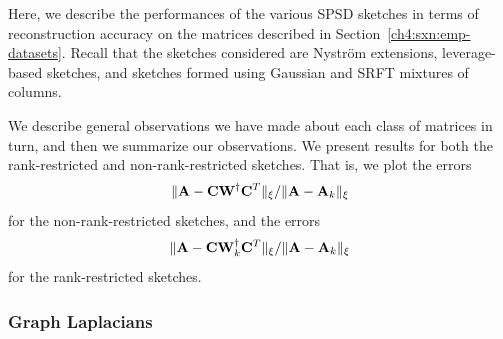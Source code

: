Here, we describe the performances of the various SPSD sketches in terms of 
reconstruction accuracy on the matrices described in 
Section~\ref{ch4:sxn:emp-datasets}. Recall that the sketches considered are
Nystr\"om extensions, leverage-based sketches, and sketches formed using 
Gaussian and SRFT mixtures of columns.

We describe general observations we have made about each class of 
matrices in turn, and then we summarize our observations.
We present results for both the rank-restricted and non-rank-restricted sketches.
That is, we plot the errors
\begin{equation}
\|\mathbf{A} - \mathbf{C} \mathbf{W}^\dagger \mathbf{C}^T\|_\xi/\|\mathbf{A} - \mathbf{A}_k\|_\xi
\label{ch4:eqn:relerr1}
\end{equation}
for the non-rank-restricted sketches, and the errors 
\begin{equation}
\|\mathbf{A} - \mathbf{C} \mathbf{W}_k^\dagger \mathbf{C}^T\|_\xi/\|\mathbf{A} - \mathbf{A}_k\|_\xi
\label{ch4:eqn:relerr2}
\end{equation}
for the rank-restricted sketches.

\subsubsection{Graph Laplacians}

